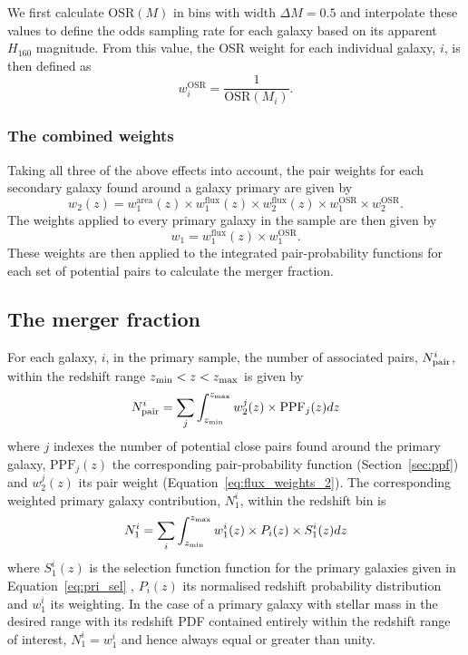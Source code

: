 We first calculate $\text{OSR}(M)$ in bins with width $\Delta M = 0.5$ and interpolate these values to define the odds sampling rate for each galaxy based on its apparent $H_{160}$ magnitude. From this value, the OSR weight for each individual galaxy, $i$, is then defined as
\begin{equation}
	w^{\text{OSR}}_{i} = \frac{1} {\text{OSR}(M_{i})}	.
\end{equation}

\subsubsection{The combined weights}
Taking all three of the above effects into account, the pair weights for each secondary galaxy found around a galaxy primary are given by
\begin{equation}\label{eq:flux_weights_2}
w_{\text{2}}(z) = w^{\text{area}}_{1}(z) \times 
							w^{\text{flux}}_{1}(z) \times w^{\text{flux}}_{2}(z) \times w^{\text{OSR}}_{1}
							\times w^{\text{OSR}}_{2}.
\end{equation}
The weights applied to every primary galaxy in the sample are then given by
\begin{equation}\label{eq:flux_weights_1}
w_{\text{1}} =  w^{\text{flux}}_{1}(z)  \times w^{\text{OSR}}_{1}.
\end{equation}
These weights are then applied to the integrated pair-probability functions for each set of potential pairs to calculate the merger fraction.

\subsection{The merger fraction}\label{sec:pair_frac}
For each galaxy, $i$, in the primary sample, the number of associated pairs, $N_{\rm{pair}}^{i}$, within the redshift range $z_{\rm{min}} < z < z_{\rm{max}}$ is given by
\begin{equation}
N_{\text{pair}}^{i} = \sum_{j} \int_{z_{\rm{min}}}^{z_{\rm{max}}} w_{\text{2}}^{j}(z)\times \text{PPF}_{j}(z) dz	
\end{equation}
where $j$ indexes the number of potential close pairs found around the primary galaxy, $\text{PPF}_{j}(z)$ the corresponding pair-probability function (Section~\ref{sec:ppf}) and $w_{\text{2}}^{j}(z)$ its pair weight (Equation~\ref{eq:flux_weights_2}). The corresponding weighted primary galaxy contribution, $N_{1}^{i}$, within the redshift bin is
\begin{equation}
 N_{1}^{i} = \sum_{i}\int_{z_{\rm{min}}}^{z_{\rm{max}}} w_{1}^{i}(z) \times P_{i}(z) \times S_{1}^{i}(z){} dz	
\end{equation} 
where $S_{1}^{i}(z)$ is the selection function function for the primary galaxies given in Equation~\ref{eq:pri_sel} , $P_{i}(z)$ its normalised redshift probability distribution and $w_{1}^{i}$ its weighting. In the case of a primary galaxy with stellar mass in the desired range with its redshift PDF contained entirely within the redshift range of interest, $N_{1}^{i} = w_{1}^{i}$ and hence always equal or greater than unity.

